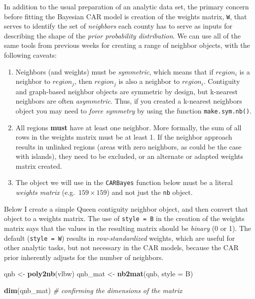 \documentclass[
]{book}
\newenvironment{Shaded}{\begin{snugshade}}{\end{snugshade}}
\newcommand{\AttributeTok}[1]{\textcolor[rgb]{0.13,0.29,0.53}{#1}}
\newcommand{\CommentTok}[1]{\textcolor[rgb]{0.56,0.35,0.01}{\textit{#1}}}
\newcommand{\FunctionTok}[1]{\textcolor[rgb]{0.13,0.29,0.53}{\textbf{#1}}}
\newcommand{\NormalTok}[1]{#1}
\newcommand{\OtherTok}[1]{\textcolor[rgb]{0.56,0.35,0.01}{#1}}
\newcommand{\StringTok}[1]{\textcolor[rgb]{0.31,0.60,0.02}{#1}}
\providecommand{\tightlist}{%
  \setlength{\itemsep}{0pt}\setlength{\parskip}{0pt}}
\begin{document}
In addition to the usual preparation of an analytic data set, the primary concern before fitting the Bayesian CAR model is creation of the weights matrix, \texttt{W}, that serves to identify the set of \emph{neighbors} each county has to serve as inputs for describing the shape of the \emph{prior probability distribution}. We can use all of the same tools from previous weeks for creating a range of neighbor objects, with the following caveats:

\begin{enumerate}
\def\labelenumi{\arabic{enumi}.}
\tightlist
\item
  Neighbors (and weights) must be \emph{symmetric}, which means that if \(region_i\) is a neighbor to \(region_j\), then \(region_j\) is also a neighbor to \(region_i\). Contiguity and graph-based neighbor objects are symmetric by design, but k-nearest neighbors are often \emph{asymmetric}. Thus, if you created a k-nearest neighbors object you may need to \emph{force symmetry} by using the function \texttt{make.sym.nb()}.
\item
  All regions \textbf{must} have at least one neighbor. More formally, the sum of all rows in the weights matrix must be at least 1. If the neighbor approach results in unlinked regions (areas with zero neighbors, as could be the case with islands), they need to be excluded, or an alternate or adapted weights matrix created.
\item
  The object we will use in the \texttt{CARBayes} function below must be a literal \emph{weights matrix} (e.g.~\(159 \times 159\)) and not just the \texttt{nb} object.
\end{enumerate}

Below I create a simple Queen contiguity neighbor object, and then convert that object to a weights matrix. The use of \texttt{style\ =\ \textquotesingle{}B\textquotesingle{}} in the creation of the weights matrix says that the values in the resulting matrix should be \emph{binary} (0 or 1). The default (\texttt{style\ =\ \textquotesingle{}W\textquotesingle{}}) results in \emph{row-standardized} weights, which are useful for other analytic tasks, but not necessary in the CAR models, because the CAR prior inherently adjusts for the number of neighbors.

\begin{Shaded}
\begin{Highlighting}[]
\NormalTok{qnb }\OtherTok{\textless{}{-}} \FunctionTok{poly2nb}\NormalTok{(vlbw)}
\NormalTok{qnb\_mat }\OtherTok{\textless{}{-}} \FunctionTok{nb2mat}\NormalTok{(qnb, }\AttributeTok{style =} \StringTok{\textquotesingle{}B\textquotesingle{}}\NormalTok{)}

\FunctionTok{dim}\NormalTok{(qnb\_mat)  }\CommentTok{\# confirming the dimensions of the matrix}
\end{Highlighting}
\end{Shaded}
\end{document}
